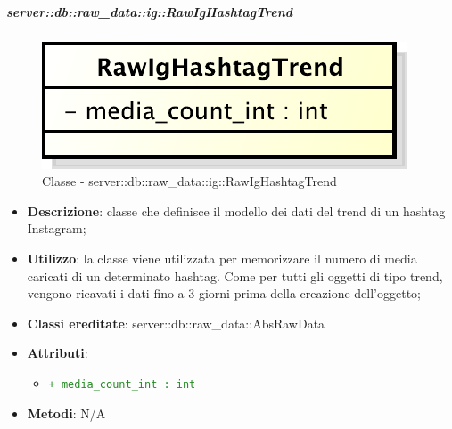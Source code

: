 		\subparagraph{server::db::raw\_data::ig::RawIgHashtagTrend} %
		\label{subp:server_db_raw_data_ig_rawighashtagtrend}
			\begin{figure}[htbp]
				\centering
				\centerline{\includegraphics[scale=0.75]{./images/server/classes/db/raw_ig_hashtag_trend.pdf}}
				\caption{Classe - server::db::raw\_data::ig::RawIgHashtagTrend}
			\end{figure}
			\begin{itemize}
				\item \textbf{Descrizione}: classe che definisce il modello dei dati del trend di un hashtag Instagram;
				\item \textbf{Utilizzo}: la classe viene utilizzata per memorizzare il numero di media caricati di un determinato hashtag. Come per tutti gli oggetti di tipo trend, vengono ricavati i dati fino a 3 giorni prima della creazione dell'oggetto;
				\item \textbf{Classi ereditate}: server::db::raw\_data::AbsRawData
				\item \textbf{Attributi}:
					\begin{itemize}
						\item \textcolor{forestgreen}{\texttt{+ media\_count\_int : int}}
					\end{itemize}
				\item \textbf{Metodi}: N/A
			\end{itemize}


